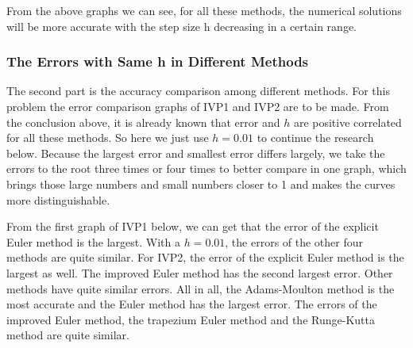 \documentclass[a4paper]{article}
\begin{document}
    From the above graphs we can see, for all these methods, the numerical solutions will be more accurate with the step size h decreasing in a certain range. 
    
    \subsubsection{The Errors with Same h in Different Methods}
    
    The second part is the accuracy comparison among different methods. For this problem the error comparison graphs of IVP1 and IVP2 are to be made. 
    From the conclusion above, it is already known that error and $h$ are positive correlated for all these methods. So here we just use $h = 0.01$ to continue the research below. 
    Because the largest error and smallest error differs largely, we take the errors to the root three times or four times to better compare in one graph, which brings those large numbers and small numbers closer to 1 and makes the curves more distinguishable.
    
   From the first graph of IVP1 below, we can get that the error of the explicit Euler method is the largest. With a $h=0.01$, the errors of the other four methods are quite similar. 
   For IVP2, the error of the explicit Euler method is the largest as well. The improved Euler method has the second largest error. Other methods have quite similar errors.
   All in all, the Adams-Moulton method is the most accurate and the Euler method has the largest error. The errors of the improved Euler method, the trapezium Euler method and the Runge-Kutta method are quite similar. 
   
\end{document}
